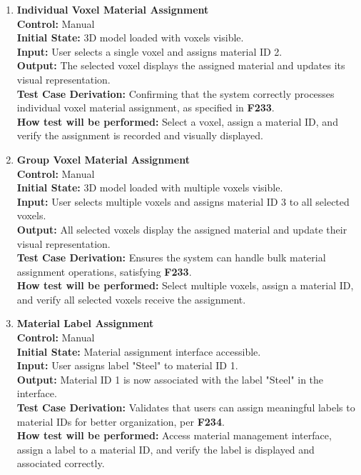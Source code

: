 \documentclass[12pt, titlepage]{article}
\begin{document}
\begin{enumerate}
  \item \textbf{Individual Voxel Material Assignment} \\[2mm]
    \textbf{Control:} Manual \\ 
    \textbf{Initial State:} 3D model loaded with voxels visible. \\ 
    \textbf{Input:} User selects a single voxel and assigns material ID 2. \\ 
    \textbf{Output:} The selected voxel displays the assigned material and updates its visual representation. \\[2mm]
    \textbf{Test Case Derivation:} Confirming that the system correctly processes individual voxel material assignment, as specified in \textbf{F233}. \\[2mm]
    \textbf{How test will be performed:} Select a voxel, assign a material ID, and verify the assignment is recorded and visually displayed.

  \item \textbf{Group Voxel Material Assignment} \\[2mm]
    \textbf{Control:} Manual \\ 
    \textbf{Initial State:} 3D model loaded with multiple voxels visible. \\ 
    \textbf{Input:} User selects multiple voxels and assigns material ID 3 to all selected voxels. \\ 
    \textbf{Output:} All selected voxels display the assigned material and update their visual representation. \\[2mm]
    \textbf{Test Case Derivation:} Ensures the system can handle bulk material assignment operations, satisfying \textbf{F233}. \\[2mm]
    \textbf{How test will be performed:} Select multiple voxels, assign a material ID, and verify all selected voxels receive the assignment.

  \item \textbf{Material Label Assignment} \\[2mm]
    \textbf{Control:} Manual \\ 
    \textbf{Initial State:} Material assignment interface accessible. \\ 
    \textbf{Input:} User assigns label "Steel" to material ID 1. \\ 
    \textbf{Output:} Material ID 1 is now associated with the label "Steel" in the interface. \\[2mm]
    \textbf{Test Case Derivation:} Validates that users can assign meaningful labels to material IDs for better organization, per \textbf{F234}. \\[2mm]
    \textbf{How test will be performed:} Access material management interface, assign a label to a material ID, and verify the label is displayed and associated correctly.


\end{enumerate}
\end{document}
